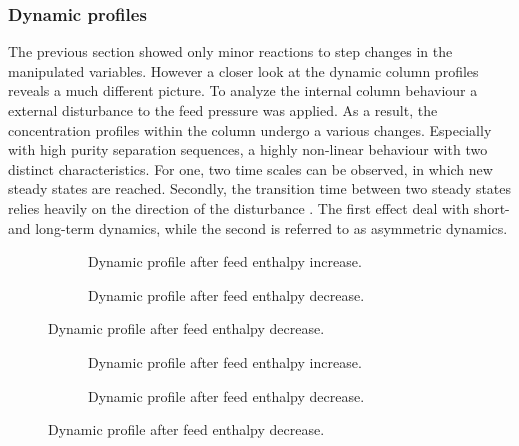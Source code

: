         \subsubsection{Dynamic profiles}
            The previous section showed only minor reactions to step changes in the manipulated variables. However
            a closer look at the dynamic column profiles reveals a much different picture. To analyze the internal
            column behaviour a external disturbance to the feed pressure was applied. As a result, the concentration
            profiles within the column undergo a various changes. Especially with high purity separation sequences,
            a highly non-linear behaviour with two distinct characteristics. For one, two time scales can
            be observed, in which new steady states are reached. Secondly, the transition time
            between two steady states relies heavily on the direction of the disturbance \cite{Hwang.1991}. The first
            effect deal with short- and long-term dynamics, while the second is referred to as asymmetric dynamics.

            \begin{figure}
                \scriptsize
                \center
                \begin{subfigure}{0.48\textwidth}
                    
                    \caption{Dynamic profile after feed enthalpy increase.}
                    \label{fig:N2_ADyn_plus}
                \end{subfigure}
                    \begin{subfigure}{0.48\textwidth}
                    
                    \caption{Dynamic profile after feed enthalpy decrease.}
                    \label{fig:N2_ADyn_minus}
                \end{subfigure}
            \end{figure}

            \begin{figure}
                \scriptsize
                \center
                \begin{subfigure}{0.48\textwidth}
                    
                    \caption{Dynamic profile after feed enthalpy increase.}
                    \label{fig:N2_ADyn_plus}
                \end{subfigure}
                    \begin{subfigure}{0.48\textwidth}
                    
                    \caption{Dynamic profile after feed enthalpy decrease.}
                    \label{fig:N2_ADyn_minus}
                \end{subfigure}
            \end{figure}

